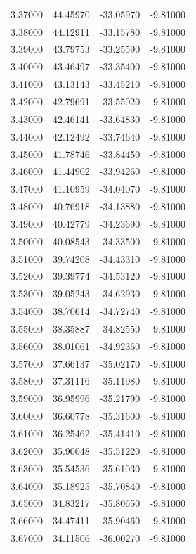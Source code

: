 \begin{table}
\begin{tabular}{llll}
3.37000 & 44.45970 & -33.05970 & -9.81000 \\
3.38000 & 44.12911 & -33.15780 & -9.81000 \\
3.39000 & 43.79753 & -33.25590 & -9.81000 \\
3.40000 & 43.46497 & -33.35400 & -9.81000 \\
3.41000 & 43.13143 & -33.45210 & -9.81000 \\
3.42000 & 42.79691 & -33.55020 & -9.81000 \\
3.43000 & 42.46141 & -33.64830 & -9.81000 \\
3.44000 & 42.12492 & -33.74640 & -9.81000 \\
3.45000 & 41.78746 & -33.84450 & -9.81000 \\
3.46000 & 41.44902 & -33.94260 & -9.81000 \\
3.47000 & 41.10959 & -34.04070 & -9.81000 \\
3.48000 & 40.76918 & -34.13880 & -9.81000 \\
3.49000 & 40.42779 & -34.23690 & -9.81000 \\
3.50000 & 40.08543 & -34.33500 & -9.81000 \\
3.51000 & 39.74208 & -34.43310 & -9.81000 \\
3.52000 & 39.39774 & -34.53120 & -9.81000 \\
3.53000 & 39.05243 & -34.62930 & -9.81000 \\
3.54000 & 38.70614 & -34.72740 & -9.81000 \\
3.55000 & 38.35887 & -34.82550 & -9.81000 \\
3.56000 & 38.01061 & -34.92360 & -9.81000 \\
3.57000 & 37.66137 & -35.02170 & -9.81000 \\
3.58000 & 37.31116 & -35.11980 & -9.81000 \\
3.59000 & 36.95996 & -35.21790 & -9.81000 \\
3.60000 & 36.60778 & -35.31600 & -9.81000 \\
3.61000 & 36.25462 & -35.41410 & -9.81000 \\
3.62000 & 35.90048 & -35.51220 & -9.81000 \\
3.63000 & 35.54536 & -35.61030 & -9.81000 \\
3.64000 & 35.18925 & -35.70840 & -9.81000 \\
3.65000 & 34.83217 & -35.80650 & -9.81000 \\
3.66000 & 34.47411 & -35.90460 & -9.81000 \\
3.67000 & 34.11506 & -36.00270 & -9.81000 \\

\end{tabular}
\end{table}
